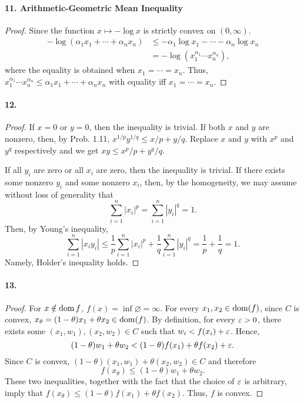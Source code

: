   \paragraph{11. Arithmetic-Geometric Mean Inequality}
  \begin{proof}
    Since the function $x\mapsto -\log x$ is strictly convex on $(0,\infty)$.
    \begin{align*}
      -\log(\alpha_1x_1+\cdots+\alpha_nx_n)
      &\le-\alpha_1\log x_1-\cdots-\alpha_n\log x_n\\
      &=-\log(x_1^{\alpha_1}\cdots x_n^{\alpha_n}),
    \end{align*}
    where the equality is obtained when $x_1=\cdots=x_n$. Thus, 
    $x_1^{\alpha_1}\cdots x_n^{\alpha_n}\le\alpha_1x_1+\cdots+\alpha_nx_n$ with
    equality iff $x_1=\cdots=x_n$.
  \end{proof}
  
  \paragraph{12.}
  \begin{proof}
    If $x=0$ or $y=0$, then the inequality is trivial. If both $x$ and $y$ are
    nonzero, then, by Prob. 1.11, $x^{1/p}y^{1/q}\le x/p+y/q$. Replace $x$ and
    $y$ with $x^p$ and $y^q$ respectively and we get $xy\le x^p/p+y^q/q$.\par
    If all $y_i$ are zero or all $x_i$ are zero, then the inequality is 
    trivial. If there exists some nonzero $y_i$ and some nonzero $x_i$, then, 
    by the homogeneity, we may assume without loss of generality that
    \[
      \sum_{i=1}^n|x_i|^p=\sum_{i=1}^n|y_i|^q=1.
    \]
    Then, by Young's inequality,
    \[
      \sum_{i=1}^n|x_iy_i|\le
      \frac{1}{p}\sum_{i=1}^n|x_i|^p+\frac{1}{q}\sum_{i=1}^n|y_i|^q
      =\frac{1}{p}+\frac{1}{q}=1.
    \]
    Namely, Holder's inequality holds.
  \end{proof}
  
  \paragraph{13.}
  \begin{proof}
    For $x\notin\operatorname{dom} f$, $f(x)=\inf\varnothing=\infty$. For every $x_1,x_2\in
    \operatorname{dom}(f)$, since $C$ is convex, $x_\theta=(1-\theta)x_1+\theta x_2\in\operatorname{dom}
    (f)$. By definition, for every $\varepsilon>0$, there exists some $(x_1,w_1),(x_2,
    w_2)\in C$ such that $w_i<f(x_i)+\varepsilon$. Hence, 
    \[
      (1-\theta)w_1+\theta w_2<(1-\theta)f(x_1)+\theta f(x_2)+\varepsilon.
    \]
    Since $C$ is convex, $(1-\theta)(x_1,w_1)+\theta(x_2,w_2)\in C$ and 
    therefore
    \[
      f(x_\theta)\le (1-\theta)w_1+\theta w_2.
    \]
    These two inequalities, together with the fact that the choice of $\varepsilon$ is
    arbitrary, imply that $f(x_\theta)\le (1-\theta)f(x_1)+\theta f(x_2)$. 
    Thus, $f$ is convex.
  \end{proof}


